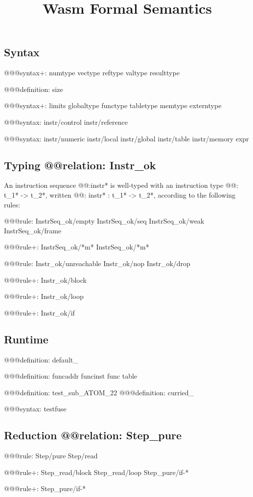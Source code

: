 \documentclass[a4paper]{scrartcl}
\title{Wasm Formal Semantics}
\begin{document}
\small

\maketitle


\subsection*{Syntax}

@@@{syntax+: {numtype vectype reftype valtype} resulttype}

@@@{definition: size}

@@@{syntax+:
  limits
  {globaltype
  functype
  tabletype
  memtype}
  {}
  externtype
}

@@@{syntax: {instr/control instr/reference}}

@@@{syntax: {instr/numeric instr/local instr/global instr/table instr/memory} expr}


\subsection*{Typing @@{relation: Instr_ok}}

An instruction sequence @@{:instr*} is well-typed with an instruction type @@{: t_1* -> t_2*}, written @@{: instr* : t_1* -> t_2*}, according to the following rules:

@@@{rule:
  {InstrSeq_ok/empty InstrSeq_ok/seq}
  {InstrSeq_ok/weak InstrSeq_ok/frame}
}

@@@{rule+: InstrSeq_ok/*m* {InstrSeq_ok/*m*}}

@@@{rule: {Instr_ok/unreachable Instr_ok/nop Instr_ok/drop}}

@@@{rule+: Instr_ok/block}

@@@{rule+: Instr_ok/loop}

@@@{rule+: Instr_ok/if}


\subsection*{Runtime}

@@@{definition: default_}

@@@{definition: {funcaddr funcinst} {func table}}

@@@{definition: test_sub_ATOM_22}
@@@{definition: curried_}

@@@{syntax: testfuse}


\subsection*{Reduction @@{relation: Step_pure}}

@@@{rule: Step/pure Step/read}

@@@{rule+: {Step_read/block Step_read/loop} {Step_pure/if-*}}

@@@{rule+: Step_pure/if-*}
\end{document}
